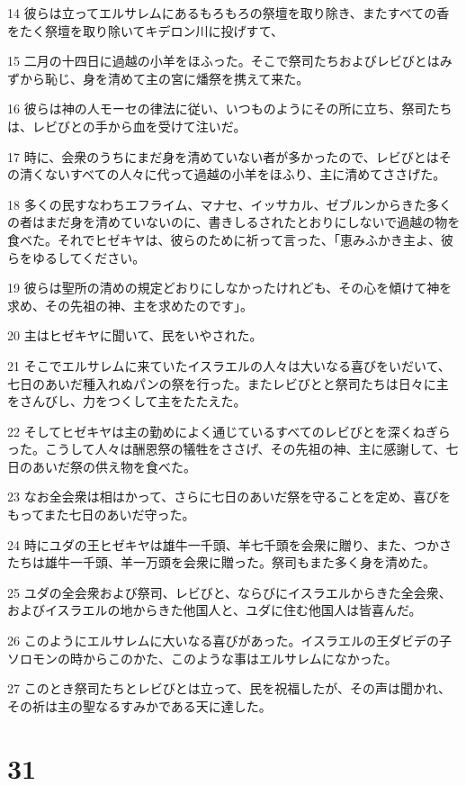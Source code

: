 \par 14 彼らは立ってエルサレムにあるもろもろの祭壇を取り除き、またすべての香をたく祭壇を取り除いてキデロン川に投げすて、
\par 15 二月の十四日に過越の小羊をほふった。そこで祭司たちおよびレビびとはみずから恥じ、身を清めて主の宮に燔祭を携えて来た。
\par 16 彼らは神の人モーセの律法に従い、いつものようにその所に立ち、祭司たちは、レビびとの手から血を受けて注いだ。
\par 17 時に、会衆のうちにまだ身を清めていない者が多かったので、レビびとはその清くないすべての人々に代って過越の小羊をほふり、主に清めてささげた。
\par 18 多くの民すなわちエフライム、マナセ、イッサカル、ゼブルンからきた多くの者はまだ身を清めていないのに、書きしるされたとおりにしないで過越の物を食べた。それでヒゼキヤは、彼らのために祈って言った、「恵みふかき主よ、彼らをゆるしてください。
\par 19 彼らは聖所の清めの規定どおりにしなかったけれども、その心を傾けて神を求め、その先祖の神、主を求めたのです」。
\par 20 主はヒゼキヤに聞いて、民をいやされた。
\par 21 そこでエルサレムに来ていたイスラエルの人々は大いなる喜びをいだいて、七日のあいだ種入れぬパンの祭を行った。またレビびとと祭司たちは日々に主をさんびし、力をつくして主をたたえた。
\par 22 そしてヒゼキヤは主の勤めによく通じているすべてのレビびとを深くねぎらった。こうして人々は酬恩祭の犠牲をささげ、その先祖の神、主に感謝して、七日のあいだ祭の供え物を食べた。
\par 23 なお全会衆は相はかって、さらに七日のあいだ祭を守ることを定め、喜びをもってまた七日のあいだ守った。
\par 24 時にユダの王ヒゼキヤは雄牛一千頭、羊七千頭を会衆に贈り、また、つかさたちは雄牛一千頭、羊一万頭を会衆に贈った。祭司もまた多く身を清めた。
\par 25 ユダの全会衆および祭司、レビびと、ならびにイスラエルからきた全会衆、およびイスラエルの地からきた他国人と、ユダに住む他国人は皆喜んだ。
\par 26 このようにエルサレムに大いなる喜びがあった。イスラエルの王ダビデの子ソロモンの時からこのかた、このような事はエルサレムになかった。
\par 27 このとき祭司たちとレビびとは立って、民を祝福したが、その声は聞かれ、その祈は主の聖なるすみかである天に達した。

\chapter{31}

